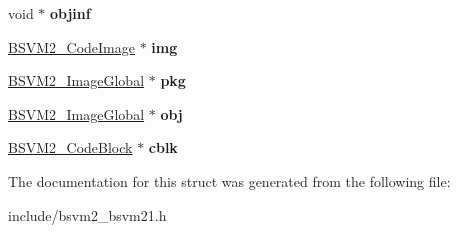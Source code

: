 \begin{DoxyCompactItemize}
\item 
\hypertarget{structBSVM2__ImageGlobal__s_ae106f70d46429d2db67e6b82245fd48f}{void $\ast$ {\bfseries objinf}}\label{structBSVM2__ImageGlobal__s_ae106f70d46429d2db67e6b82245fd48f}

\item 
\hypertarget{structBSVM2__ImageGlobal__s_a7e1d3293984f9629fe59d70e1385c999}{\hyperlink{structBSVM2__CodeImage__s}{B\-S\-V\-M2\-\_\-\-Code\-Image} $\ast$ {\bfseries img}}\label{structBSVM2__ImageGlobal__s_a7e1d3293984f9629fe59d70e1385c999}

\item 
\hypertarget{structBSVM2__ImageGlobal__s_a6e554dc5e997daf93218bd8fa6fa6e99}{\hyperlink{structBSVM2__ImageGlobal__s}{B\-S\-V\-M2\-\_\-\-Image\-Global} $\ast$ {\bfseries pkg}}\label{structBSVM2__ImageGlobal__s_a6e554dc5e997daf93218bd8fa6fa6e99}

\item 
\hypertarget{structBSVM2__ImageGlobal__s_aad8b4ba50395cefee133330465f7bf95}{\hyperlink{structBSVM2__ImageGlobal__s}{B\-S\-V\-M2\-\_\-\-Image\-Global} $\ast$ {\bfseries obj}}\label{structBSVM2__ImageGlobal__s_aad8b4ba50395cefee133330465f7bf95}

\item 
\hypertarget{structBSVM2__ImageGlobal__s_acf1d0f4211184b672c1901fbdf9b256c}{\hyperlink{structBSVM2__CodeBlock__s}{B\-S\-V\-M2\-\_\-\-Code\-Block} $\ast$ {\bfseries cblk}}\label{structBSVM2__ImageGlobal__s_acf1d0f4211184b672c1901fbdf9b256c}

\end{DoxyCompactItemize}


The documentation for this struct was generated from the following file\-:\begin{DoxyCompactItemize}
\item 
include/bsvm2\-\_\-bsvm21.\-h\end{DoxyCompactItemize}
